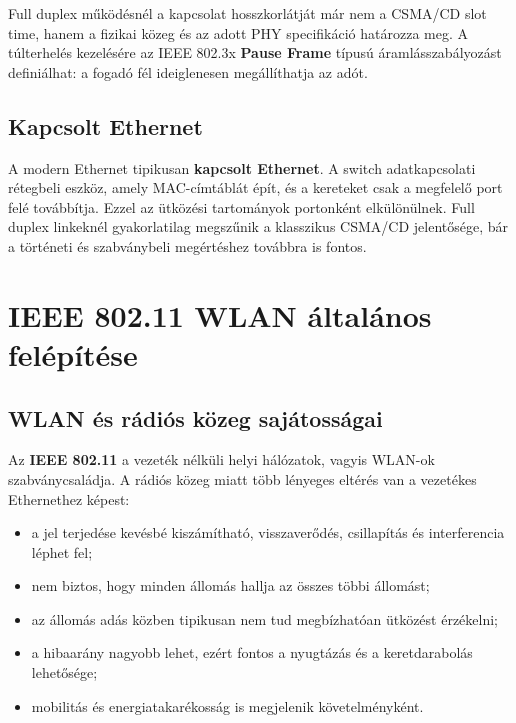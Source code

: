 Full duplex működésnél a kapcsolat hosszkorlátját már nem a CSMA/CD slot time, hanem a fizikai közeg és az adott PHY specifikáció határozza meg. A túlterhelés kezelésére az IEEE 802.3x \textbf{Pause Frame} típusú áramlásszabályozást definiálhat: a fogadó fél ideiglenesen megállíthatja az adót.

\subsection{Kapcsolt Ethernet}

A modern Ethernet tipikusan \textbf{kapcsolt Ethernet}. A switch adatkapcsolati rétegbeli eszköz, amely MAC-címtáblát épít, és a kereteket csak a megfelelő port felé továbbítja. Ezzel az ütközési tartományok portonként elkülönülnek. Full duplex linkeknél gyakorlatilag megszűnik a klasszikus CSMA/CD jelentősége, bár a történeti és szabványbeli megértéshez továbbra is fontos.

\begin{center}

\end{center}

\section{IEEE 802.11 WLAN általános felépítése}

\subsection{WLAN és rádiós közeg sajátosságai}

Az \textbf{IEEE 802.11} a vezeték nélküli helyi hálózatok, vagyis WLAN-ok szabványcsaládja. A rádiós közeg miatt több lényeges eltérés van a vezetékes Ethernethez képest:

\begin{itemize}
  \item a jel terjedése kevésbé kiszámítható, visszaverődés, csillapítás és interferencia léphet fel;
  \item nem biztos, hogy minden állomás hallja az összes többi állomást;
  \item az állomás adás közben tipikusan nem tud megbízhatóan ütközést érzékelni;
  \item a hibaarány nagyobb lehet, ezért fontos a nyugtázás és a keretdarabolás lehetősége;
  \item mobilitás és energiatakarékosság is megjelenik követelményként.
\end{itemize}

